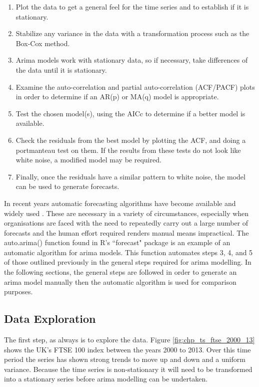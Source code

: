 \begin{enumerate}
\item Plot the data to get a general feel for the time series and to establish if it is stationary.
\item Stabilize any variance in the data with a transformation process such as the Box-Cox method.
\item Arima models work with stationary data, so if necessary, take differences of the data until it is stationary.
\item Examine the auto-correlation and partial auto-correlation (ACF/PACF) plots in order to determine if an AR(p) or MA(q) model is appropriate.
\item Test the chosen model(s), using the AICc to determine if a better model is available.
\item Check the residuals from the best model by plotting the ACF, and doing a portmanteau test on them. If the results from these tests do not look like white noise, a modified model may be required.
\item Finally, once the residuals have a similar pattern to white noise, the model can be used to generate forecasts.
\end{enumerate}


In recent years automatic forecasting algorithms have become available and widely used \citep{Hyndman08automatictime}. These are necessary in a variety of circumstances, especially when organisations are faced with the need to repeatedly carry out a large number of forecasts and the human effort required renders manual means impractical. The auto.arima() function found in R's \textquotedblleft forecast" package is an example of an automatic algorithm for arima models. This function automates steps 3, 4, and 5 of those outlined previously in the general steps required for arima modelling. In the following sections, the general steps are followed in order to generate an arima model manually then the automatic algorithm is used for comparison purposes.

\subsection{Data Exploration}

The first step, as always is to explore the data. Figure \ref{fig:chp_ts_ftse_2000_13} shows the UK's FTSE 100 index between the years 2000 to 2013. Over this time period the series has shown strong trends to move up and down and a uniform variance. Because the time series is non-stationary it will need to be transformed into a stationary series before arima modelling can be undertaken.

